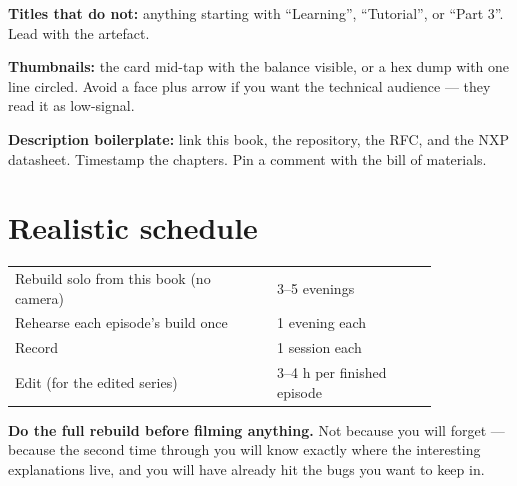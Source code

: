 \textbf{Titles that do not:} anything starting with ``Learning'', ``Tutorial'',
or ``Part 3''. Lead with the artefact.

\textbf{Thumbnails:} the card mid-tap with the balance visible, or a hex dump
with one line circled. Avoid a face plus arrow if you want the technical
audience --- they read it as low-signal.

\textbf{Description boilerplate:} link this book, the repository, the RFC, and
the NXP datasheet. Timestamp the chapters. Pin a comment with the bill of
materials.

\section{Realistic schedule}

\begin{center}\small
\begin{tabular}{@{}L{0.52\linewidth}L{0.32\linewidth}@{}}
\toprule
{} &  \\
\midrule
Rebuild solo from this book (no camera) & 3--5 evenings \\
Rehearse each episode's build once      & 1 evening each \\
Record                                  & 1 session each \\
Edit (for the edited series)            & 3--4 h per finished episode \\
\bottomrule
\end{tabular}
\end{center}

\textbf{Do the full rebuild before filming anything.} Not because you will forget
--- because the second time through you will know exactly where the interesting
explanations live, and you will have already hit the bugs you want to keep in.
